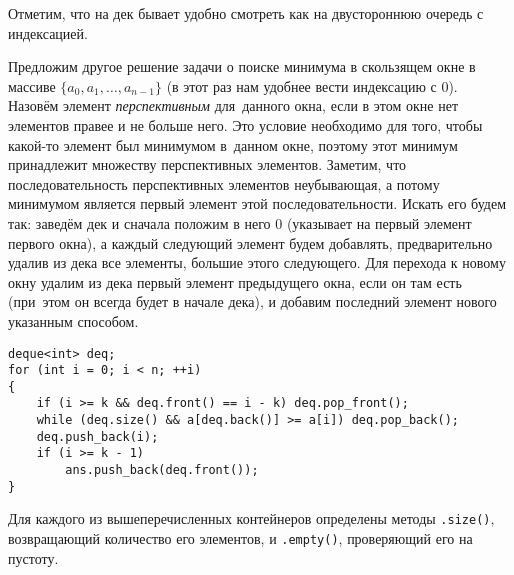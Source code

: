 \begin{center}
\end{center}

Отметим, что на дек бывает удобно смотреть как на двустороннюю очередь с индексацией.

Предложим другое решение задачи о поиске минимума в \mbox{скользящем} окне в массиве $\{a_0, a_1, \ldots, a_{n - 1}\}$ (в этот раз нам удобнее вести индексацию с $0$). Назовём элемент \textit{перспективным} для~данного окна, если в этом окне нет элементов правее и не больше него. Это условие необходимо для того, чтобы какой-то элемент был \mbox{минимумом} в~данном окне, поэтому этот минимум принадлежит множеству перспективных элементов. Заметим, что последовательность перспективных элементов неубывающая, а потому минимумом является первый элемент этой последовательности. Искать его будем так: заведём дек и сначала положим в него $0$ (\mbox{указывает} на первый элемент первого окна), а каждый следующий элемент будем добавлять, предварительно удалив из дека все элементы, большие этого следующего. Для перехода к новому окну удалим из дека первый элемент предыдущего окна, если он там есть (при~этом он всегда будет в начале дека), и добавим последний элемент нового указанным способом.

\begin{verbatim}
deque<int> deq;
for (int i = 0; i < n; ++i)
{
    if (i >= k && deq.front() == i - k) deq.pop_front();
    while (deq.size() && a[deq.back()] >= a[i]) deq.pop_back();
    deq.push_back(i);
    if (i >= k - 1)
        ans.push_back(deq.front());
}
\end{verbatim}

Для каждого из вышеперечисленных контейнеров определены методы \texttt{.size()}, возвращающий количество его элементов, и \texttt{.empty()}, проверяющий его на пустоту.
